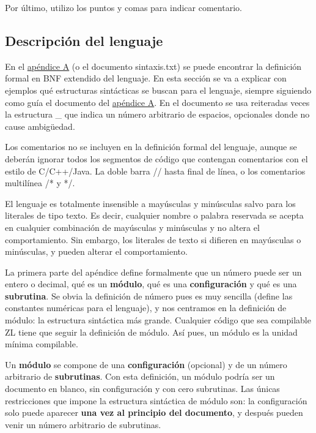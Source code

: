 \documentclass{report}
\begin{document}
	Por último, utilizo los puntos y comas para indicar comentario.
	
	\subsection{Descripción del lenguaje}
	
	En el \hyperref[app:a]{apéndice A} (o el documento sintaxis.txt) se puede encontrar la definición formal en BNF extendido del lenguaje. En esta sección se va a explicar con ejemplos qué estructuras sintácticas se buscan para el lenguaje, siempre siguiendo como guía el documento del \hyperref[app:a]{apéndice A}. En el documento se usa reiteradas veces la estructura \_ que indica un número arbitrario de espacios, opcionales donde no cause ambigüedad. 
	
	\vspace{10px}
	
	Los comentarios no se incluyen en la definición formal del lenguaje, aunque se deberán ignorar todos los segmentos de código que contengan comentarios con el estilo de C/C++/Java. La doble barra // hasta final de línea, o los comentarios multilínea /* y */.
	
	\vspace{10px}
	
	El lenguaje es totalmente insensible a mayúsculas y minúsculas salvo para los literales de tipo texto. Es decir, cualquier nombre o palabra reservada se acepta en cualquier combinación de mayúsculas y minúsculas y no altera el comportamiento. Sin embargo, los literales de texto si difieren en mayúsculas o minúsculas, y pueden alterar el comportamiento.
	
	\vspace{10px}
	
	La primera parte del apéndice define formalmente que un número puede ser un entero o decimal, qué es un \textbf{módulo}, qué es una \textbf{configuración} y qué es una \textbf{subrutina}. Se obvia la definición de número pues es muy sencilla (define las constantes numéricas para el lenguaje), y nos centramos en la definición de módulo: la estructura sintáctica más grande. Cualquier código que sea compilable ZL tiene que seguir la definición de módulo. Así pues, un módulo es la unidad mínima compilable.   
	
	\vspace{10px}
	
	Un \textbf{módulo} se compone de una \textbf{configuración} (opcional) y de un número arbitrario de \textbf{subrutinas}. Con esta definición, un módulo podría ser un documento en blanco, sin configuración y con cero subrutinas. Las únicas restricciones que impone la estructura sintáctica de módulo son: la configuración solo puede aparecer \textbf{una vez al principio del documento}, y después pueden venir un número arbitrario de subrutinas. 
	
\end{document}
